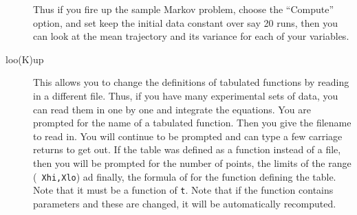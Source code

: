 \begin{description}
Thus if you fire up the sample Markov problem, choose the ``Compute''
option, and set keep the initial data constant over say 20 runs, then
you can look at the mean trajectory and its variance for each of your
variables.  

\item[loo(K)up ] This allows you to change the definitions of
tabulated functions by reading in a different file.  Thus, if you have
many experimental sets of data, you can read them in one by one and
integrate the equations. You are prompted for the name of a tabulated
function.  Then you give the filename to read in.  You will continue
to be prompted and can type a few carriage returns to get out. If the
table was defined as a function instead of a file, then you will be
prompted for the number of points, the limits of the range ({\tt
Xhi,Xlo}) ad finally, the formula of for the function defining the
table.  Note that it must be a function of {\tt t}.  Note that if the
function contains parameters and these are changed, it will be
automatically recomputed.



\end{description}
